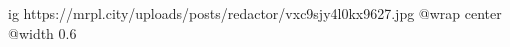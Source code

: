  
 
 
 
 

\ifcmt
  ig https://mrpl.city/uploads/posts/redactor/vxc9sjy4l0kx9627.jpg
  @wrap center
  @width 0.6
\fi
